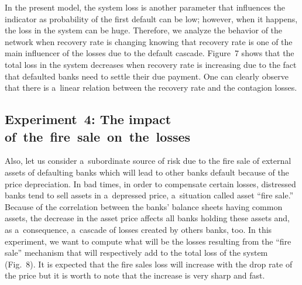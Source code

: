 \begin{multicols}{2}
\noindent
In the present model, the system loss is another parameter that influences the indicator 
as probability of the first default can be low; however, when it happens, the loss in 
the system can be huge. Therefore, we analyze the behavior of the network when 
recovery rate is changing knowing that recovery rate is one of the main 
influencer of the losses due to the default cascade.
Figure~7 shows that the total loss in the system decreases when 
recovery rate is increasing  due to the fact that defaulted banks need to settle 
their due payment. One can clearly observe that there is a~linear relation 
between the recovery rate and the contagion losses.



 \subsection{Experiment~4: The impact of~the~fire~sale~on~the~losses} 

\noindent
Also, let us consider a~subordinate source of risk due to the fire sale of 
external assets of defaulting banks which
 will lead to other banks default 
because of the price depreciation. In bad times,  in order to compensate certain 
losses, distressed banks tend to sell assets in a~depressed price, a~situation 
called asset ``fire sale.'' Because of the correlation between the banks' balance 
sheets having common assets, the decrease in the asset price affects all banks 
holding these assets and, as a~consequence, a~cascade of losses created by others 
banks, too. In this experiment, we want to compute what will be the losses 
resulting from the ``fire sale'' mechanism that will respectively add to the 
total loss of the system (Fig.~8). It is expected that the fire sales loss will increase 
with the drop rate of the price but it is worth to note that the increase is 
very sharp and fast.




    \begin{figure*} %
    \vspace*{1pt}
\begin{center}
\mbox{%
\epsfxsize=162.513mm
}
\end{center}
\vspace*{-9pt}
        \end{figure*}



\end{multicols}
